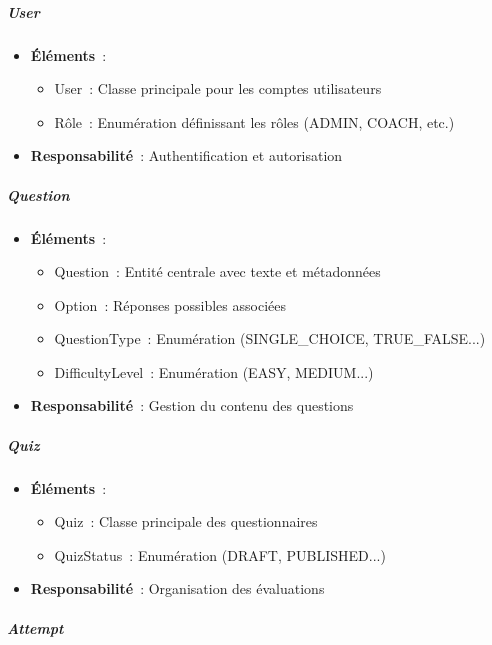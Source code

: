 \documentclass[12pt,a4paper,twoside]{report}
\begin{document}
\hypertarget{user}{%
\subparagraph{User}\label{user}}

\begin{itemize}
\item
  \textbf{Éléments}~:

  \begin{itemize}
  \item
    User~: Classe principale pour les comptes utilisateurs
  \item
    Rôle~: Enumération définissant les rôles (ADMIN, COACH, etc.)
  \end{itemize}
\item
  \textbf{Responsabilité}~: Authentification et autorisation
\end{itemize}

\hypertarget{question}{%
\subparagraph{Question}\label{question}}

\begin{itemize}
\item
  \textbf{Éléments}~:

  \begin{itemize}
  \item
    Question~: Entité centrale avec texte et métadonnées
  \item
    Option~: Réponses possibles associées
  \item
    QuestionType~: Enumération (SINGLE\_CHOICE, TRUE\_FALSE...)
  \item
    DifficultyLevel~: Enumération (EASY, MEDIUM...)
  \end{itemize}
\item
  \textbf{Responsabilité}~: Gestion du contenu des questions
\end{itemize}

\hypertarget{quiz}{%
\subparagraph{Quiz}\label{quiz}}

\begin{itemize}
\item
  \textbf{Éléments}~:

  \begin{itemize}
  \item
    Quiz~: Classe principale des questionnaires
  \item
    QuizStatus~: Enumération (DRAFT, PUBLISHED...)
  \end{itemize}
\item
  \textbf{Responsabilité}~: Organisation des évaluations
\end{itemize}

\hypertarget{attempt}{%
\subparagraph{Attempt}\label{attempt}}
\end{document}
